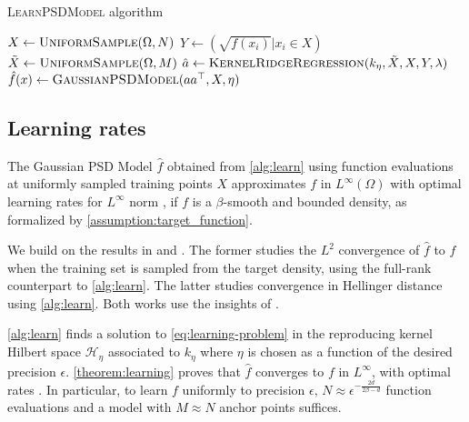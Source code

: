 \begin{algorithm}[ht!]
\caption{\textsc{LearnPSDModel} algorithm}\label{alg:learn}
{}
$X \gets \textsc{UniformSample}(\Omega, N)$  \BlankLine
$Y \gets (\sqrt{f(x_i)} \vert x_i \in X)$\;\BlankLine
$\tilde X\gets \textsc{UniformSample}(\Omega, M)$\;  \BlankLine
$\hat a \gets \textsc{KernelRidgeRegression}(k_\eta, \tilde X, X, Y, \lambda)$ \;  \BlankLine
$\hat f(x) \gets \textsc{GaussianPSDModel}(aa^\top , X, \eta)$\;\BlankLine
{}
\end{algorithm}

\subsection{Learning rates}\label{sec:learning}
The Gaussian PSD Model $\hat f$ obtained from \cref{alg:learn} using function evaluations at uniformly sampled training points $X$ approximates $f$ in $L^\infty(\Omega)$ with optimal learning rates for $L^\infty$ norm \citep{wendland2004scattered}, if $f$ is a $\beta$-smooth and bounded density, as formalized by \cref{assumption:target_function}.

We build on the results in \cite{ciliberto2021} and \cite{sampling-ulysse}. The former studies the $L^2$ convergence of $\hat f$ to $f$ when the training set is sampled from the target density, using the full-rank counterpart to \cref{alg:learn}. The latter studies convergence in Hellinger distance using \cref{alg:learn}. Both works use the insights of \cite{less-is-more}.

\cref{alg:learn} finds a solution to \cref{eq:learning-problem} in the reproducing kernel Hilbert space $\mathcal H_\eta$ associated to $k_\eta$ where $\eta$ is chosen as a function of the desired precision $\epsilon$. \cref{theorem:learning} proves that $\hat f$ converges to $f$ in $L^\infty$, with optimal rates \citep{wendland2004scattered}. In particular, to learn $f$ uniformly to precision $\epsilon$, $N\approx\epsilon^{-\frac{2d}{2\beta -d}}$ function evaluations and a model with $M \approx N$ anchor points suffices.


